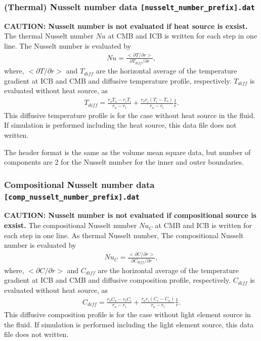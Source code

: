 \subsubsection{(Thermal) Nusselt number data {\tt [nusselt\_number\_prefix].dat}}
{\bf CAUTION: Nusselt number is not evaluated if heat source is exsist.}
The thermal Nusselt number $Nu$ at CMB and ICB is written for each step in one line. The Nusselt number is evaluated by
%
\begin{eqnarray*}
Nu = \frac{<\partial T / \partial r>}{\partial T_{diff}/ \partial r},
\end{eqnarray*}
where, $<\partial T / \partial r>$ and $T_{diff}$ are the horizontal average of the temperature gradient at ICB and CMB and diffusive temperature profile, respectively. $T_{diff}$ is evaluated without heat source, as
\begin{eqnarray*}
T_{diff} = \frac{r_{o}T_{o} - r_{i}T_{i}}{r_{o} - r_{i}}
    +  \frac{r_{o}r_{i}\left(T_{i} - T_{o}\right)}{r_{o} - r_{i}} \frac{1}{r}.
\end{eqnarray*}
%
This diffusive temperature profile is for the case without heat source in the fluid. If simulation is performed including the heat source, this data file does not written.

The header format is the same as the volume mean square data, but number of components are 2 for the Nusselt number for the inner and outer boundaries.

\subsubsection{Compositional Nusselt number data {\tt [comp\_nusselt\_number\_prefix].dat}}
{\bf CAUTION: Nusselt number is not evaluated if compositional source is exsist.}
The compositional Nusselt number $Nu_{C}$ at CMB and ICB is written for each step in one line. As thermal Nusselt number, The compositional Nusselt number is evaluated by
%
\begin{eqnarray*}
Nu_{C} = \frac{<\partial C / \partial r>}{\partial C_{diff}/ \partial r},
\end{eqnarray*}
where, $<\partial C / \partial r>$ and $C_{diff}$ are the horizontal average of the temperature gradient at ICB and CMB and diffusive composition profile, respectively. $C_{diff}$ is evaluated without heat source, as
\begin{eqnarray*}
C_{diff} = \frac{r_{o}C_{o} - r_{i}C_{i}}{r_{o} - r_{i}}
    +  \frac{r_{o}r_{i}\left(C_{i} - C_{o}\right)}{r_{o} - r_{i}} \frac{1}{r}.
\end{eqnarray*}
%
This diffusive composition profile is for the case without light element source in the fluid. If simulation is performed including the light element source, this data file does not written.

